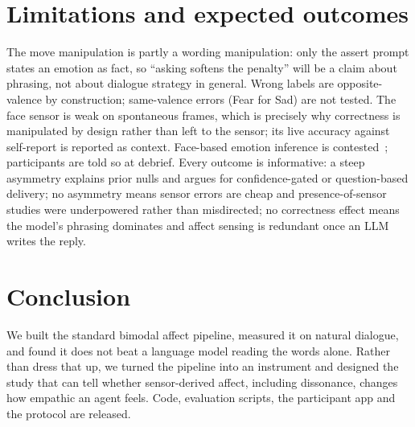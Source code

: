 \documentclass[sigconf,nonacm]{acmart}
\begin{document}
\section{Limitations and expected outcomes}
The move manipulation is partly a wording manipulation: only the assert prompt states an emotion as fact, so ``asking softens the penalty'' will be a claim about phrasing, not about dialogue strategy in general. Wrong labels are opposite-valence by construction; same-valence errors (Fear for Sad) are not tested. The face sensor is weak on spontaneous frames, which is precisely why correctness is manipulated by design rather than left to the sensor; its live accuracy against self-report is reported as context. Face-based emotion inference is contested~\cite{barrett2019emotional}; participants are told so at debrief. Every outcome is informative: a steep asymmetry explains prior nulls and argues for confidence-gated or question-based delivery; no asymmetry means sensor errors are cheap and presence-of-sensor studies were underpowered rather than misdirected; no correctness effect means the model's phrasing dominates and affect sensing is redundant once an LLM writes the reply.

\section{Conclusion}
We built the standard bimodal affect pipeline, measured it on natural dialogue, and found it does not beat a language model reading the words alone. Rather than dress that up, we turned the pipeline into an instrument and designed the study that can tell whether sensor-derived affect, including dissonance, changes how empathic an agent feels. Code, evaluation scripts, the participant app and the protocol are released.

\balance


\end{document}
